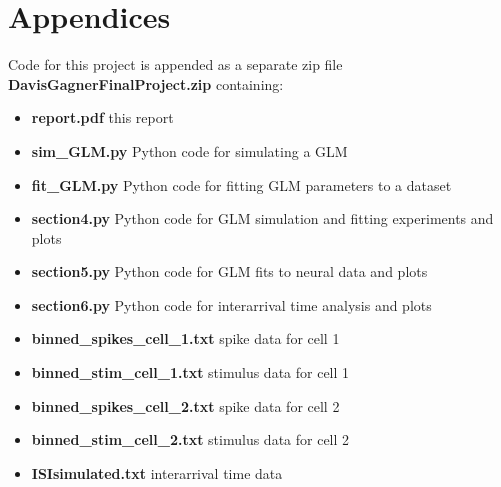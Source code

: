 \documentclass[letterpaper,titlepage,10pt]{article}
\begin{document}
\section{Appendices}

Code for this project is appended as a separate zip file \textbf{DavisGagnerFinalProject.zip} containing:

\begin{itemize}
\item \textbf{report.pdf} this report
\item \textbf{sim\_GLM.py} Python code for simulating a GLM
\item \textbf{fit\_GLM.py} Python code for fitting GLM parameters to a dataset
\item \textbf{section4.py} Python code for GLM simulation and fitting experiments and plots
\item \textbf{section5.py} Python code for GLM fits to neural data and plots
\item \textbf{section6.py} Python code for interarrival time analysis and plots
\item \textbf{binned\_spikes\_cell\_1.txt} spike data for cell 1
\item \textbf{binned\_stim\_cell\_1.txt} stimulus data for cell 1
\item \textbf{binned\_spikes\_cell\_2.txt} spike data for cell 2
\item \textbf{binned\_stim\_cell\_2.txt} stimulus data for cell 2
\item \textbf{ISIsimulated.txt} interarrival time data
\end{itemize}
\end{document}
